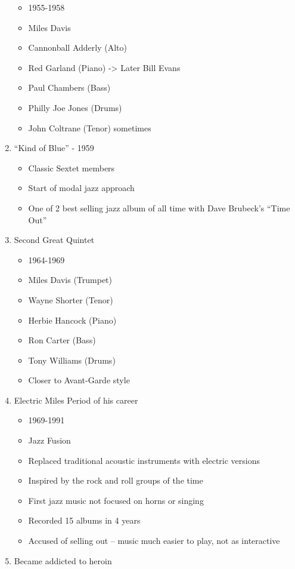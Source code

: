 \documentclass[]{article}
\providecommand{\tightlist}{%
  \setlength{\itemsep}{0pt}\setlength{\parskip}{0pt}}
\begin{document}
\begin{enumerate}
  \begin{itemize}
  \tightlist
  \item
    1955-1958
  \item
    Miles Davis
  \item
    Cannonball Adderly (Alto)
  \item
    Red Garland (Piano) -\textgreater{} Later Bill Evans
  \item
    Paul Chambers (Bass)
  \item
    Philly Joe Jones (Drums)
  \item
    John Coltrane (Tenor) sometimes
  \end{itemize}
\item
  ``Kind of Blue'' - 1959

  \begin{itemize}
  \tightlist
  \item
    Classic Sextet members
  \item
    Start of modal jazz approach
  \item
    One of 2 best selling jazz album of all time with Dave Brubeck's
    ``Time Out''
  \end{itemize}
\item
  Second Great Quintet

  \begin{itemize}
  \tightlist
  \item
    1964-1969
  \item
    Miles Davis (Trumpet)
  \item
    Wayne Shorter (Tenor)
  \item
    Herbie Hancock (Piano)
  \item
    Ron Carter (Bass)
  \item
    Tony Williams (Drums)
  \item
    Closer to Avant-Garde style
  \end{itemize}
\item
  Electric Miles Period of his career

  \begin{itemize}
  \tightlist
  \item
    1969-1991
  \item
    Jazz Fusion
  \item
    Replaced traditional acoustic instruments with electric versions
  \item
    Inspired by the rock and roll groups of the time
  \item
    First jazz music not focused on horns or singing
  \item
    Recorded 15 albums in 4 years
  \item
    Accused of selling out -- music much easier to play, not as
    interactive
  \end{itemize}
\item
  Became addicted to heroin


\end{enumerate}
\end{document}
